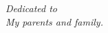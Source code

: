
\vspace*{\fill}

\begin{center}
{\it Dedicated to}\\
{\it My parents and family.}
\end{center}

\vspace*{\fill}
